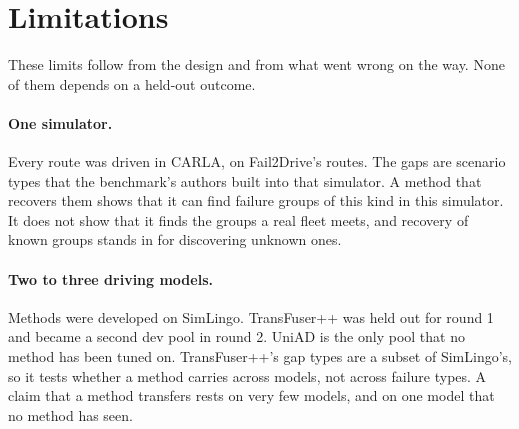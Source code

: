 \section{Limitations}
\label{sec:limitations}

These limits follow from the design and from what went wrong on the way. None
of them depends on a held-out outcome.

\paragraph{One simulator.}
Every route was driven in CARLA, on Fail2Drive's routes. The gaps are scenario
types that the benchmark's authors built into that simulator. A method that
recovers them shows that it can find failure groups of this kind in this
simulator. It does not show that it finds the groups a real fleet meets, and
recovery of known groups stands in for discovering unknown ones.

\paragraph{Two to three driving models.}
Methods were developed on SimLingo. TransFuser++ was held out for round 1 and
became a second dev pool in round 2. UniAD is the only pool that no method has
been tuned on. TransFuser++'s gap types are a subset of SimLingo's, so it tests
whether a method carries across models, not across failure types. A claim that
a method transfers rests on very few models, and on one model that no method
has seen.

